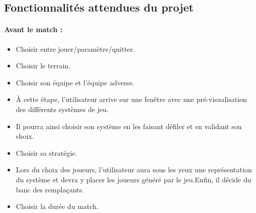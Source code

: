 \vspace{10pt}

\subsection{Fonctionnalités attendues du projet}
\label{sec:spec2}

\paragraph{Avant le match :}

\begin{itemize}

    \item Choisir entre jouer/paramètre/quitter.

    \vspace{10pt}
    
    \item Choisir le terrain.

    \vspace{10pt}

    \item Choisir son équipe et l’équipe adverse.

    \vspace{10pt}
    
    \item À cette étape, l’utilisateur arrive sur une fenêtre avec une pré-visualisation des différents systèmes de jeu.

    \vspace{10pt}

    \item Il pourra ainsi choisir son système en les faisant défiler et en validant son choix.

    \vspace{10pt}
    
    \item Choisir sa stratégie.

    \vspace{10pt}

    \item Lors du choix des joueurs, l’utilisateur aura sous les yeux une représentation du système et devra y placer les joueurs généré par le jeu.Enfin, il décide du banc des remplaçants. 

    \vspace{10pt}

    \item Choisir la durée du match.
\end{itemize}

